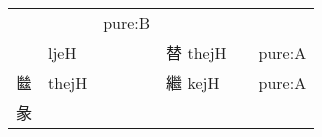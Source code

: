 \documentclass[14pt,a4paper]{scrartcl}
\begin{document}
\begin{longtable}[c]{@{}llllll@{}}
\begin{minipage}[t]{0.14\columnwidth}
\strut\end{minipage} &
\begin{minipage}[t]{0.14\columnwidth}\raggedright\strut
\strut\end{minipage} &
\begin{minipage}[t]{0.14\columnwidth}\raggedright\strut
pure:B
\strut\end{minipage}\tabularnewline
\begin{minipage}[t]{0.14\columnwidth}\raggedright\strut
𤾕
\strut\end{minipage} &
\begin{minipage}[t]{0.14\columnwidth}\raggedright\strut
ljeH
\strut\end{minipage} &
\begin{minipage}[t]{0.14\columnwidth}\raggedright\strut
\strut\end{minipage} &
\begin{minipage}[t]{0.14\columnwidth}\raggedright\strut
替 thejH
\strut\end{minipage} &
\begin{minipage}[t]{0.14\columnwidth}\raggedright\strut
\strut\end{minipage} &
\begin{minipage}[t]{0.14\columnwidth}\raggedright\strut
pure:A
\strut\end{minipage}\tabularnewline
\begin{minipage}[t]{0.14\columnwidth}\raggedright\strut
㡭
\strut\end{minipage} &
\begin{minipage}[t]{0.14\columnwidth}\raggedright\strut
thejH
\strut\end{minipage} &
\begin{minipage}[t]{0.14\columnwidth}\raggedright\strut
\strut\end{minipage} &
\begin{minipage}[t]{0.14\columnwidth}\raggedright\strut
繼 kejH
\strut\end{minipage} &
\begin{minipage}[t]{0.14\columnwidth}\raggedright\strut
\strut\end{minipage} &
\begin{minipage}[t]{0.14\columnwidth}\raggedright\strut
pure:A
\strut\end{minipage}\tabularnewline
\begin{minipage}[t]{0.14\columnwidth}\raggedright\strut
彖
\strut\end{minipage} &
\begin{minipage}[t]{0.14\columnwidth}\raggedright\strut

\end{minipage}
\end{longtable}
\end{document}
